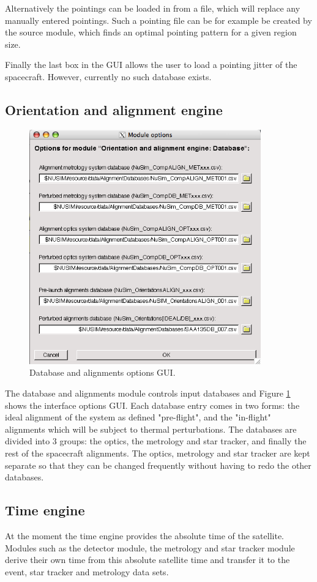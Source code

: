 Alternatively the pointings can be loaded in from a file, which will replace any manually entered pointings. Such a pointing file can be for example be created by the source module, which finds an optimal pointing pattern for a given region size.

Finally the last box in the GUI allows the user to load a pointing jitter of the spacecraft. However, currently no such database exists.

\subsection{Orientation and alignment engine}
\begin{figure}[tb]
\begin{center}
\includegraphics[width=10cm]{images/DBgui.png}  
\caption{Database and alignments options GUI.}
\label{dbgui} 
\end{center}
\end{figure}

The database and alignments module controls input databases and Figure \ref{dbgui} shows the interface options GUI. Each database entry comes in two forms: the ideal alignment of the system as defined "pre-flight", and the "in-flight" alignments which will be subject to thermal perturbations. The databases are divided into 3 groups: the optics, the metrology and star tracker, and finally the rest of the spacecraft alignments. The optics, metrology and star tracker are kept separate so that they can be changed frequently without having to redo the other databases.

\subsection{Time engine}
At the moment the time engine provides the absolute time of the satellite. Modules such as the detector module, the metrology and star tracker module derive their own time from this absolute satellite time and transfer it to the event, star tracker and metrology data sets.   

